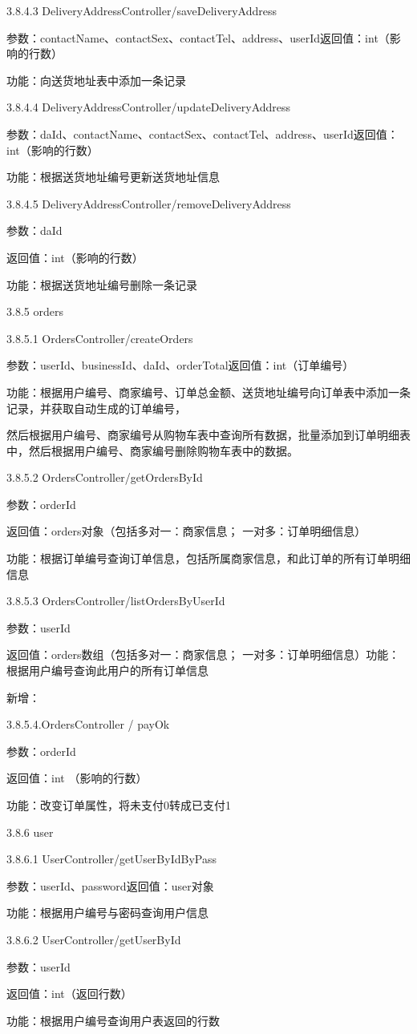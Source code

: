     3.8.4.3 DeliveryAddressController/saveDeliveryAddress

    参数：contactName、contactSex、contactTel、address、userId返回值：int（影响的行数）

    功能：向送货地址表中添加一条记录

    3.8.4.4 DeliveryAddressController/updateDeliveryAddress

    参数：daId、contactName、contactSex、contactTel、address、userId返回值：int（影响的行数）

    功能：根据送货地址编号更新送货地址信息

    3.8.4.5 DeliveryAddressController/removeDeliveryAddress

    参数：daId

    返回值：int（影响的行数）

    功能：根据送货地址编号删除一条记录

    \protect\hypertarget{2.3.5.orders}{}{}3.8.5 orders

    3.8.5.1 OrdersController/createOrders

    参数：userId、businessId、daId、orderTotal返回值：int（订单编号）

    功能：根据用户编号、商家编号、订单总金额、送货地址编号向订单表中添加一条记录，并获取自动生成的订单编号，

    然后根据用户编号、商家编号从购物车表中查询所有数据，批量添加到订单明细表中，然后根据用户编号、商家编号删除购物车表中的数据。

    3.8.5.2 OrdersController/getOrdersById

    参数：orderId

    返回值：orders对象（包括多对一：商家信息； 一对多：订单明细信息）

    功能：根据订单编号查询订单信息，包括所属商家信息，和此订单的所有订单明细信息

    3.8.5.3 OrdersController/listOrdersByUserId

    参数：userId

    返回值：orders数组（包括多对一：商家信息；
    一对多：订单明细信息）功能：根据用户编号查询此用户的所有订单信息

    新增：

    3.8.5.4.OrdersController / payOk

    参数：orderId

    返回值：int （影响的行数）

    功能：改变订单属性，将未支付0转成已支付1

    \protect\hypertarget{2.3.6.user}{}{}3.8.6 user

    3.8.6.1 UserController/getUserByIdByPass

    参数：userId、password返回值：user对象

    功能：根据用户编号与密码查询用户信息

    3.8.6.2 UserController/getUserById

    参数：userId

    返回值：int（返回行数）

    功能：根据用户编号查询用户表返回的行数

